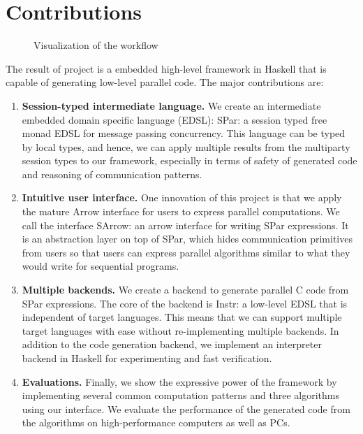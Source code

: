 \section{Contributions} 
\begin{figure}[ht]
    \centering
    \caption{Visualization of the workflow}
    \label{intro:fig:workflow}
\end{figure}
The result of project is a embedded high-level framework in Haskell that is capable of generating low-level parallel code. The major contributions are:
\begin{enumerate}
    \item \textbf{Session-typed intermediate language. } We create an intermediate embedded domain specific language (EDSL): SPar: a session typed free monad EDSL for message passing concurrency. This language can be typed by local types, and hence, we can apply multiple results from the multiparty session types to our framework, especially in terms of safety of generated code and reasoning of communication patterns.
    \item \textbf{Intuitive user interface. } One innovation of this project is that we apply the mature Arrow interface for users to express parallel computations. We call the interface SArrow: an arrow interface for writing SPar expressions. It is an abstraction layer on top of SPar, which hides communication primitives from users so that users can express parallel algorithms similar to what they would write for sequential programs.
    \item \textbf{Multiple backends. } We create a backend to generate parallel C code from SPar expressions. The core of the backend is Instr: a low-level EDSL that is independent of target languages. This means that we can support multiple target languages with ease without re-implementing multiple backends. In addition to the code generation backend, we implement an interpreter backend in Haskell for experimenting and fast verification.
    \item \textbf{Evaluations. } Finally, we show the expressive power of the framework by implementing several common computation patterns and three algorithms using our interface. We evaluate the performance of the generated code from the algorithms on high-performance computers as well as PCs. 
\end{enumerate}
